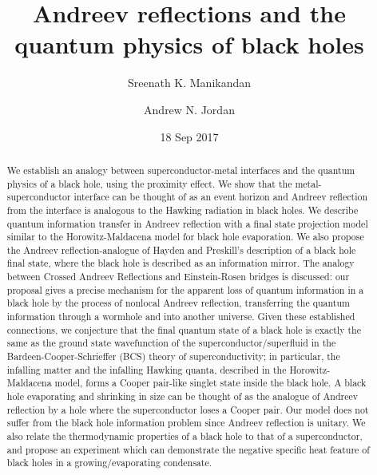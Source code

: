 \documentclass[12pt,letterpaper,aps,onecolumn,superscriptaddress,floatfix,notitlepage]{revtex4-1}
\begin{document}
\date{18 Sep 2017}

	\title{Andreev reflections and the quantum physics of black holes} \author{Sreenath K. Manikandan}
	\author{Andrew N. Jordan}
	
	\begin{abstract}
		We establish an analogy between superconductor-metal interfaces and the quantum physics of a black hole, using the proximity effect. We show that the metal-superconductor interface can be thought of as an event horizon and Andreev reflection from the interface is analogous to the Hawking radiation in black holes. We describe quantum information transfer in Andreev reflection with a final state projection model similar to the Horowitz-Maldacena model for black hole evaporation.  We also propose the Andreev reflection-analogue of Hayden and Preskill's description of a black hole final state, where the black hole is described as an information mirror. The analogy between Crossed Andreev Reflections and Einstein-Rosen bridges is discussed: our proposal gives a precise mechanism for the apparent loss of quantum information in a black hole by the process of nonlocal Andreev reflection, transferring the quantum information through a wormhole and into another universe. Given these established connections, we conjecture that the final quantum state of a black hole is exactly the same as the ground state wavefunction of the superconductor/superfluid in the Bardeen-Cooper-Schrieffer (BCS) theory of superconductivity; in particular, the infalling matter and the infalling Hawking quanta, described in the Horowitz-Maldacena model, forms a Cooper pair-like singlet state inside the black hole. A black hole evaporating and shrinking in size can be thought of as the analogue of Andreev reflection by a hole where the superconductor loses a Cooper pair. Our model does not suffer from the black hole information problem since Andreev reflection is unitary. We also relate the thermodynamic properties of a black hole to that of a superconductor, and propose an experiment which can demonstrate the negative specific heat feature of black holes in a growing/evaporating condensate.
	\end{abstract}
	
\end{document}
